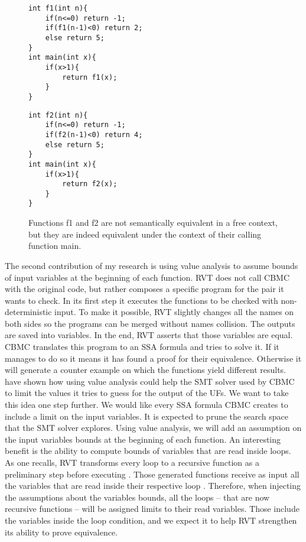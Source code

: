 \begin{figure}[h]
\begin{center}
\begin{minipage}{7 cm}


\begin{lstlisting}
int f1(int n){
	if(n<=0) return -1;
	if(f1(n-1)<0) return 2;
	else return 5; 
}
int main(int x){ 
	if(x>1){
		return f1(x); 
	} 
}
\end{lstlisting}
\end{minipage}
\begin{minipage}{7 cm}
\begin{lstlisting}
int f2(int n){
	if(n<=0) return -1;
	if(f2(n-1)<0) return 4;
	else return 5; 
}
int main(int x){ 
	if(x>1){
		return f2(x); 
	} 
}
\end{lstlisting}
    


\end{minipage}
\caption{ Functions f1 and f2 are not semantically equivalent in a free context, but they are indeed equivalent under the context of their calling function main.}
\label{fig:maorExample}
\end{center}
\end{figure}
 
The second contribution of my research is using value analysis to assume bounds of input variables at the beginning of each function. RVT does not call CBMC with the original code, but rather composes a specific program for the pair it wants to check. In its first step it executes the functions to be checked with non-deterministic input. To make it possible, RVT slightly changes all the names on both sides so the programs can be merged without names collision. The outputs are saved into variables. In the end, RVT asserts that those variables are equal. CBMC translates this program to an SSA formula and tries to solve it. If it manages to do so it means it has found a proof for their equivalence. Otherwise it will generate a counter example on which the functions yield different results. \cite{DBLP:conf/fm/StrichmanV16} have shown how using value analysis could help the SMT solver used by CBMC to limit the values it tries to guess for the output of the UFs. We want to take this idea one step further. We would like every SSA formula CBMC creates to include a limit on the input variables. It is expected to prune the search space that the SMT solver explores. Using value analysis, we will add an assumption on the input variables bounds at the beginning of each function. An interesting benefit is the ability to compute bounds of variables that are read inside loops. As one recalls, RVT transforms every loop to a recursive function as a preliminary step before executing . Those generated functions receive as input all the variables that are read inside their respective loop \cite{DBLP:conf/vstte/StrichmanG05}. Therefore, when injecting the assumptions about the variables bounds, all the loops – that are now recursive functions – will be assigned limits to their read variables. Those include the variables inside the loop condition, and we expect it to help RVT strengthen its ability to prove equivalence. 

